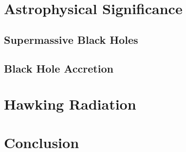 \documentclass{article}
\begin{document}

\section{Astrophysical Significance}
\label{sec:astrophysical_significance}

\subsection{Supermassive Black Holes}
\label{subsec:supermassive_bh}


\subsection{Black Hole Accretion}
\label{subsec:black_hole_accretion}


\section{Hawking Radiation}
\label{sec:hawking_radiation}


\section{Conclusion}
\label{sec:conclusion}
\end{document}
